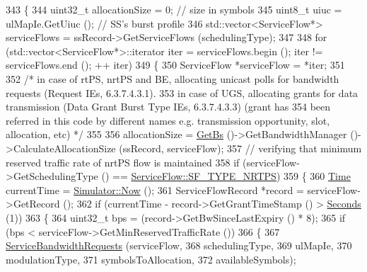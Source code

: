\begin{DoxyCode}
343 \{
344   uint32\_t allocationSize = 0; \textcolor{comment}{// size in symbols}
345   uint8\_t uiuc = ulMapIe.GetUiuc (); \textcolor{comment}{// SS's burst profile}
346   std::vector<ServiceFlow*> serviceFlows = ssRecord->GetServiceFlows (schedulingType);
347 
348   \textcolor{keywordflow}{for} (std::vector<ServiceFlow*>::iterator iter = serviceFlows.begin (); iter != serviceFlows.end (); ++
      iter)
349     \{
350       ServiceFlow *serviceFlow = *iter;
351 
352       \textcolor{comment}{/* in case of rtPS, nrtPS and BE, allocating unicast polls for bandwidth requests (Request IEs,
       6.3.7.4.3.1).}
353 \textcolor{comment}{       in case of UGS, allocating grants for data transmission (Data Grant Burst Type IEs, 6.3.7.4.3.3)
       (grant has}
354 \textcolor{comment}{       been referred in this code by different names e.g. transmission opportunity, slot, allocation, etc) 
      */}
355 
356       allocationSize = \hyperlink{classns3_1_1UplinkScheduler_afe61b7de71d92d2dff1b135744a6ff7e}{GetBs} ()->GetBandwidthManager ()->CalculateAllocationSize (ssRecord, 
      serviceFlow);
357       \textcolor{comment}{// verifying that minimum reserved traffic rate of nrtPS flow is maintained}
358       \textcolor{keywordflow}{if} (serviceFlow->GetSchedulingType () == \hyperlink{classns3_1_1ServiceFlow_a7990ba10be1e098328fd1e6382a26235a7f8577f851a9f01d159442a3a3fcdf48}{ServiceFlow::SF\_TYPE\_NRTPS})
359         \{
360           \hyperlink{namespacens3_1_1TracedValueCallback_a7ffd3e7c142ffe7c8a1d2db9b8de38ec}{Time} currentTime = \hyperlink{classns3_1_1Simulator_ac3178fa975b419f7875e7105be122800}{Simulator::Now} ();
361           ServiceFlowRecord *record = serviceFlow->GetRecord ();
362           \textcolor{keywordflow}{if} (currentTime - record->GetGrantTimeStamp () > \hyperlink{group__timecivil_ga33c34b816f8ff6628e33d5c8e9713b9e}{Seconds} (1))
363             \{
364               uint32\_t bps = (record->GetBwSinceLastExpiry () * 8);
365               \textcolor{keywordflow}{if} (bps < serviceFlow->GetMinReservedTrafficRate ())
366                 \{
367                   \hyperlink{classns3_1_1UplinkSchedulerSimple_ad420cfa439ba7c319fab7dd0db299408}{ServiceBandwidthRequests} (serviceFlow,
368                                             schedulingType,
369                                             ulMapIe,
370                                             modulationType,
371                                             symbolsToAllocation,
372                                             availableSymbols);

\end{DoxyCode}
